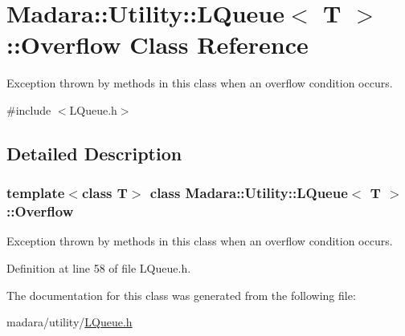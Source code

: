 \hypertarget{classMadara_1_1Utility_1_1LQueue_1_1Overflow}{
\section{Madara::Utility::LQueue$<$ T $>$::Overflow Class Reference}
\label{d4/d45/classMadara_1_1Utility_1_1LQueue_1_1Overflow}
}


Exception thrown by methods in this class when an overflow condition occurs.  




{\ttfamily \#include $<$LQueue.h$>$}



\subsection{Detailed Description}
\subsubsection*{template$<$class T$>$ class Madara::Utility::LQueue$<$ T $>$::Overflow}

Exception thrown by methods in this class when an overflow condition occurs. 

Definition at line 58 of file LQueue.h.



The documentation for this class was generated from the following file:\begin{DoxyCompactItemize}
\item 
madara/utility/\hyperlink{LQueue_8h}{LQueue.h}\end{DoxyCompactItemize}
